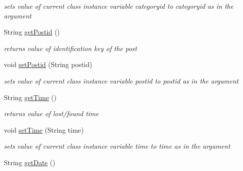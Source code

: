 \begin{DoxyCompactItemize}
\begin{DoxyCompactList}\small\item\em sets value of current class instance variable categoryid to categoryid as in the argument \end{DoxyCompactList}\item 
String \hyperlink{classcom_1_1example_1_1sel_1_1lostfound_1_1UserPost_a80475c33f4fb24120e5749b8d4eaa8cd}{get\+Postid} ()\hypertarget{classcom_1_1example_1_1sel_1_1lostfound_1_1UserPost_a80475c33f4fb24120e5749b8d4eaa8cd}{}\label{classcom_1_1example_1_1sel_1_1lostfound_1_1UserPost_a80475c33f4fb24120e5749b8d4eaa8cd}

\begin{DoxyCompactList}\small\item\em returns value of identification key of the post \end{DoxyCompactList}\item 
void \hyperlink{classcom_1_1example_1_1sel_1_1lostfound_1_1UserPost_adda27053c3527cdd6dcdd0d16ea45c9e}{set\+Postid} (String postid)\hypertarget{classcom_1_1example_1_1sel_1_1lostfound_1_1UserPost_adda27053c3527cdd6dcdd0d16ea45c9e}{}\label{classcom_1_1example_1_1sel_1_1lostfound_1_1UserPost_adda27053c3527cdd6dcdd0d16ea45c9e}

\begin{DoxyCompactList}\small\item\em sets value of current class instance variable postid to postid as in the argument \end{DoxyCompactList}\item 
String \hyperlink{classcom_1_1example_1_1sel_1_1lostfound_1_1UserPost_a77c13234097e4f44f6e0710c74987f87}{get\+Time} ()\hypertarget{classcom_1_1example_1_1sel_1_1lostfound_1_1UserPost_a77c13234097e4f44f6e0710c74987f87}{}\label{classcom_1_1example_1_1sel_1_1lostfound_1_1UserPost_a77c13234097e4f44f6e0710c74987f87}

\begin{DoxyCompactList}\small\item\em returns value of lost/found time \end{DoxyCompactList}\item 
void \hyperlink{classcom_1_1example_1_1sel_1_1lostfound_1_1UserPost_a7022a68202224f955065e5b400bb3e95}{set\+Time} (String time)\hypertarget{classcom_1_1example_1_1sel_1_1lostfound_1_1UserPost_a7022a68202224f955065e5b400bb3e95}{}\label{classcom_1_1example_1_1sel_1_1lostfound_1_1UserPost_a7022a68202224f955065e5b400bb3e95}

\begin{DoxyCompactList}\small\item\em sets value of current class instance variable time to time as in the argument \end{DoxyCompactList}\item 
String \hyperlink{classcom_1_1example_1_1sel_1_1lostfound_1_1UserPost_a9699a5945d28663ac8d74c2b19baf8ea}{get\+Date} ()\hypertarget{classcom_1_1example_1_1sel_1_1lostfound_1_1UserPost_a9699a5945d28663ac8d74c2b19baf8ea}{}\label{classcom_1_1example_1_1sel_1_1lostfound_1_1UserPost_a9699a5945d28663ac8d74c2b19baf8ea}


\end{DoxyCompactItemize}
